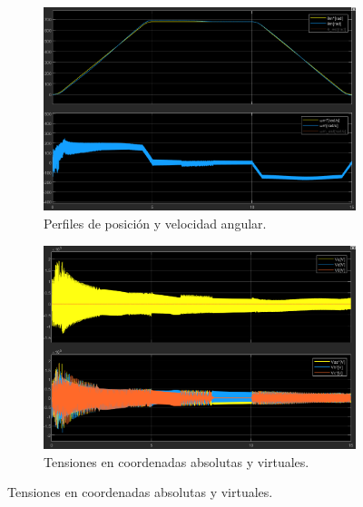 \documentclass{article}
\begin{document}
\begin{figure}[htbp]
    \centering
    \begin{subfigure}{0.45\textwidth}
        \centering
        \includegraphics[width=\textwidth]{Imagenes/Posicion_Velocidad_ModuladorTNI.png}
        \caption{Perfiles de posición y velocidad angular.}
        \label{fig:Posicion_Velocidad_ModuladorTNI}
    \end{subfigure}
    \hfill
    \begin{subfigure}{0.45\textwidth}
        \centering
        \includegraphics[width=\textwidth]{Imagenes/Consignas_Tensiones_ModuladorTNImejorado.png}
        \caption{Tensiones en coordenadas absolutas y virtuales.}
        \label{fig:Consignas_Tensiones_ModuladorTNImejorado}
    \end{subfigure}


\end{figure}
\end{document}
